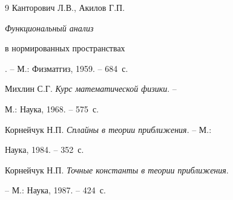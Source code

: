 \begin{thebibliography}{9}
 Канторович Л.В., Акилов Г.П. {\it Функциональный анализ


в нормированных пространствах}. -- М.: Физматгиз, 1959. -- 684~с.


 Михлин С.Г. {\it Курс математической физики}. --


М.: Наука, 1968. -- 575~с.


 Корнейчук Н.П. {\it Сплайны в теории приближения}. -- М.:


Наука, 1984. -- 352~с.


 Корнейчук Н.П. {\it Точные константы в теории приближения}.


-- М.: Наука, 1987. -- 424~с.





\end{thebibliography}





\vskip 2cm












\label{end}








